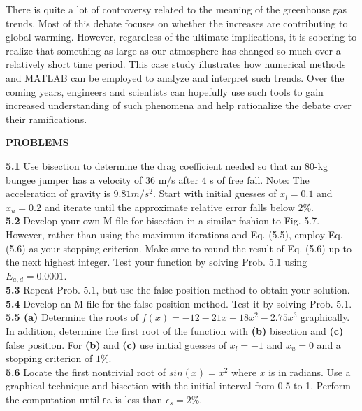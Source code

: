 \documentclass[../main.tex]{subfiles}
\begin{document}
There is quite a lot of controversy related to the meaning of the greenhouse gas trends.
Most of this debate focuses on whether the increases are contributing to global warming.
However, regardless of the ultimate implications, it is sobering to realize that something as
large as our atmosphere has changed so much over a relatively short time period. This case
study illustrates how numerical methods and MATLAB can be employed to analyze and interpret
such trends. Over the coming years, engineers and scientists can hopefully use such
tools to gain increased understanding of such phenomena and help rationalize the debate
over their ramifications.\\
\bigskip

\noindent\textbf{PROBLEMS}
\begin{multicols}{2}
    \noindent\textbf{5.1} Use bisection to determine the drag coefficient needed
    so that an 80-kg bungee jumper has a velocity of 36 m/s after
    4 s of free fall. Note: The acceleration of gravity is $9.81 m/s^2$.
    Start with initial guesses of $x_l = 0.1$ and $x_u = 0.2$ and iterate
    until the approximate relative error falls below $2\%$.\\

    \noindent\textbf{5.2} Develop your own M-file for bisection in a similar fashion
    to Fig. 5.7. However, rather than using the maximum iterations
    and Eq. (5.5), employ Eq. (5.6) as your stopping criterion. Make
    sure to round the result of Eq. (5.6) up to the next highest integer.
    Test your function by solving Prob. 5.1 using $E_{a,d} = 0.0001$.\\

    \noindent\textbf{5.3} Repeat Prob. 5.1, but use the false-position method to
    obtain your solution.\\

    \noindent\textbf{5.4} Develop an M-file for the false-position method. Test it
    by solving Prob. 5.1.\\

    \noindent\textbf{5.5 (a)} Determine the roots of $f (x) = -12 - 21x + 18x^2 - 2.75x^3$
     graphically. In addition, determine the first
    root of the function with \textbf{(b)} bisection and \textbf{(c)} false position.
    For \textbf{(b)} and \textbf{(c)} use initial guesses of $x_l = -1$ and $x_u = 0$
    and a stopping criterion of $1\%$.\\

    \noindent\textbf{5.6} Locate the first nontrivial root of $sin(x) = x^2$ where $x$ is
    in radians. Use a graphical technique and bisection with the
    initial interval from 0.5 to 1. Perform the computation until
    εa is less than $\epsilon_s = 2\%$.\\


\end{multicols}
\end{document}
